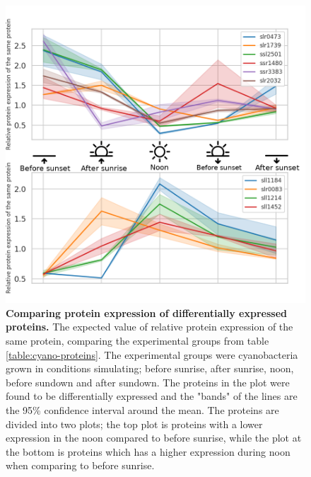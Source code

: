 \begin{figure}[H]
  \begin{center}
  \includegraphics[width=0.8\linewidth]{results/combined_edited.png}
  \caption{\textbf{Comparing protein expression of differentially expressed proteins.} The expected value of relative protein expression of the same protein, comparing the experimental groups from table \ref{table:cyano-proteins}. The experimental groups were cyanobacteria grown in conditions simulating; before sunrise, after sunrise, noon, before sundown and after sundown. The proteins in the plot were found to be differentially expressed and the "bands" of the lines are the 95\% confidence interval around the mean. The proteins are divided into two plots; the top plot is proteins with a lower expression in the noon compared to before sunrise, while the plot at the bottom is proteins which has a higher expression during noon when comparing to before sunrise.}
  \label{fig:expression}
  \end{center}
\end{figure}
